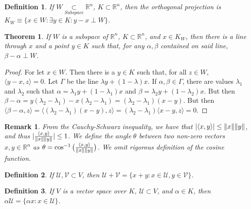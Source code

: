 \documentclass[crop=false,class=book]{standalone}
\theoremstyle{mystyle}
\newtheorem{theorem}{Theorem}[section]
\newtheorem{definition}{Definition}[section]
\newtheorem{remark}{Remark}[section]
\DeclarePairedDelimiter\norm{\lVert}{\rVert}
\begin{document}
\begin{definition}
If $W\underset{Subspace}\subset\mathbb{R}^n$, $K \subset \mathbb{R}^n$, then the orthogonal projection is $K_{W}\equiv\{x\in W: \exists y\in K: y-x \perp W\}$.
\end{definition}
\begin{theorem}
If $W$ is a subspace of $\mathbb{R}^n$, $K \subset \mathbb{R}^n$, and $x\in K_{W}$, then there is a line through $x$ and a point $y\in K$ such that, for any $\alpha, \beta$ contained on said line, $\beta-\alpha \perp W$.
\end{theorem}
\begin{proof}
For let $x\in W$. Then there is a $y\in K$ such that, for all $z\in W$, $\langle y-x,z\rangle = 0$. Let $\Gamma$ be the line $\lambda y + (1-\lambda)x$. If $\alpha,\beta \in \Gamma$, there are values $\lambda_1$ and $\lambda_2$ such that $\alpha = \lambda_1 y+ (1-\lambda_1)x$ and $\beta = \lambda_2 y +(1-\lambda_2)x$. But then $\beta-\alpha = y(\lambda_2-\lambda_1)-x(\lambda_2-\lambda_1) = (\lambda_2-\lambda_1)(x-y)$. But then $\langle \beta - \alpha,z\rangle = \langle (\lambda_2-\lambda_1)(x-y),z\rangle = (\lambda_2-\lambda_1)\langle x-y,z \rangle = 0$.
\end{proof}
\begin{remark}
From the Cauchy-Schwarz inequality, we have that $|\langle x,y \rangle| \leq \norm{x}\norm{y}$, and thus $|\frac{\langle x,y \rangle}{\norm{x}\norm{y}}| \leq 1$. We define the $angle\ \theta$ between two non-zero vectors $x,y\in \mathbb{R}^n$ as $\theta=\cos^{-1}\big(\frac{\langle x,y \rangle}{\norm{x}\norm{y}}\big)$. We omit rigorous definition of the cosine function.
\end{remark}
\begin{definition}
If $\mathcal{U},\mathcal{V}\subset V$, then $\mathcal{U}+\mathcal{V} = \{x+y:x\in \mathcal{U},y\in \mathcal{V}\}$.
\end{definition}
\begin{definition}
If $V$ is a vector space over $K$, $\mathcal{U}\subset V$, and $\alpha \in K$, then $\alpha \mathcal{U} = \{\alpha x:x\in \mathcal{U}\}$.
\end{definition}
\end{document}
